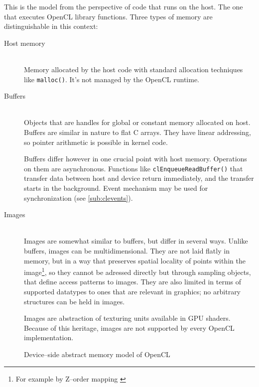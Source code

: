 This is the model from the perspective of code that runs on the host. The one
that executes OpenCL library functions. Three types of memory are distinguishable
in this context:

\begin{description}
  \item[Host memory] \hfill \\
    Memory allocated by the host code with standard allocation techniques
    like \texttt{malloc()}. It's not managed by the OpenCL runtime.
  \item[Buffers] \hfill \\
    Objects that are handles for global or constant memory allocated on host.
    Buffers are similar in nature to flat C arrays. They have linear addressing,
    so pointer arithmetic is possible in kernel code.

    Buffers differ however in one crucial point with host memory. Operations
    on them are asynchronous. Functions like \texttt{clEnqueue\-Read\-Buffer()} that
    transfer data between host and device return immediately, and the transfer
    starts in the background. Event mechanism may be used for synchronization
    (see \autoref{sub:clevents}).
  \item[Images] \hfill \\
    Images are somewhat similar to buffers, but differ in several ways.
    Unlike buffers, images can be multidimensional. They are not laid flatly in
    memory, but in a way that preserves spatial locality of points within the
    image\footnote{For example by Z--order mapping \parencite[p. 111-113]{gaster2012heterogeneous}},
    so they cannot be adressed directly but through sampling objects, that define
    access patterns to images. They are also limited in terms of supported
    datatypes to ones that are relevant in graphics; no arbitrary structures can
    be held in images.

    Images are abstraction of texturing units available in GPU shaders. Because
    of this heritage, images are not supported by every OpenCL implementation.

\end{description}
\begin{figure}[htb]
  \begin{center}
    
  \end{center}
  \caption{Device--side abstract memory model of OpenCL \parencite{gaster2012heterogeneous}}
  \label{fig:clmemmodel}
\end{figure}
\pagebreak
